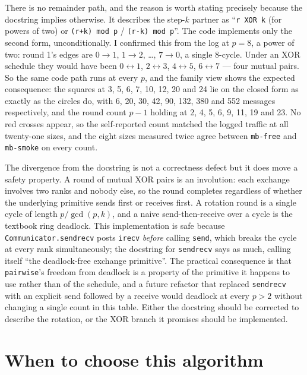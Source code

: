 \documentclass[11pt]{article}
\begin{document}
There is no remainder path, and the reason is worth stating precisely because the docstring
implies otherwise. It describes the step-$k$ partner as ``\texttt{r XOR k} (for powers of two)
or \texttt{(r+k) mod p} / \texttt{(r-k) mod p}''. The code implements only the second form,
unconditionally. I confirmed this from the log at $p=8$, a power of two: round 1's edges are
$0\to1$, $1\to2$, \ldots, $7\to0$, a single 8-cycle. Under an XOR schedule they would have been
$0\leftrightarrow1$, $2\leftrightarrow3$, $4\leftrightarrow5$, $6\leftrightarrow7$ --- four
mutual pairs. So the same code path runs at every $p$, and the family view shows the expected
consequence: the squares at 3, 5, 6, 7, 10, 12, 20 and 24 lie on the closed form as exactly as
the circles do, with 6, 20, 30, 42, 90, 132, 380 and 552 messages respectively, and the round
count $p-1$ holding at 2, 4, 5, 6, 9, 11, 19 and 23. No red crosses appear, so the
self-reported count matched the logged traffic at all twenty-one sizes, and the eight sizes
measured twice agree between \texttt{mb-free} and \texttt{mb-smoke} on every count.

The divergence from the docstring is not a correctness defect but it does move a safety
property. A round of mutual XOR pairs is an involution: each exchange involves two ranks and
nobody else, so the round completes regardless of whether the underlying primitive sends
first or receives first. A rotation round is a single cycle of length $p/\gcd(p,k)$, and a
naive send-then-receive over a cycle is the textbook ring deadlock. This implementation is safe
because \texttt{Communicator.sendrecv} posts \texttt{irecv} \emph{before} calling
\texttt{send}, which breaks the cycle at every rank simultaneously; the docstring for
\texttt{sendrecv} says as much, calling itself ``the deadlock-free exchange primitive''. The
practical consequence is that \texttt{pairwise}'s freedom from deadlock is a property of the
primitive it happens to use rather than of the schedule, and a future refactor that replaced
\texttt{sendrecv} with an explicit send followed by a receive would deadlock at every
$p > 2$ without changing a single count in this table. Either the docstring should be
corrected to describe the rotation, or the XOR branch it promises should be implemented.

\section{When to choose this algorithm}
\end{document}

